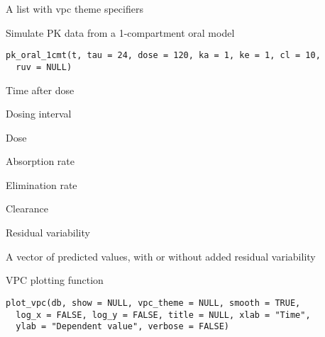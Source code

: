 \documentclass[letterpaper]{book}
\begin{document}
%
\begin{Value}
A list with vpc theme specifiers
\end{Value}
%
\begin{Description}\relax
Simulate PK data from a 1-compartment oral model
\end{Description}
%
\begin{Usage}
\begin{verbatim}
pk_oral_1cmt(t, tau = 24, dose = 120, ka = 1, ke = 1, cl = 10,
  ruv = NULL)
\end{verbatim}
\end{Usage}
%
\begin{Arguments}
\begin{ldescription}
\item[\code{t}] Time after dose

\item[\code{tau}] Dosing interval

\item[\code{dose}] Dose

\item[\code{ka}] Absorption rate

\item[\code{ke}] Elimination rate

\item[\code{cl}] Clearance

\item[\code{ruv}] Residual variability
\end{ldescription}
\end{Arguments}
%
\begin{Value}
A vector of predicted values, with or without added residual variability
\end{Value}
%
\begin{Description}\relax
VPC plotting function
\end{Description}
%
\begin{Usage}
\begin{verbatim}
plot_vpc(db, show = NULL, vpc_theme = NULL, smooth = TRUE,
  log_x = FALSE, log_y = FALSE, title = NULL, xlab = "Time",
  ylab = "Dependent value", verbose = FALSE)
\end{verbatim}
\end{Usage}
%
\end{document}

